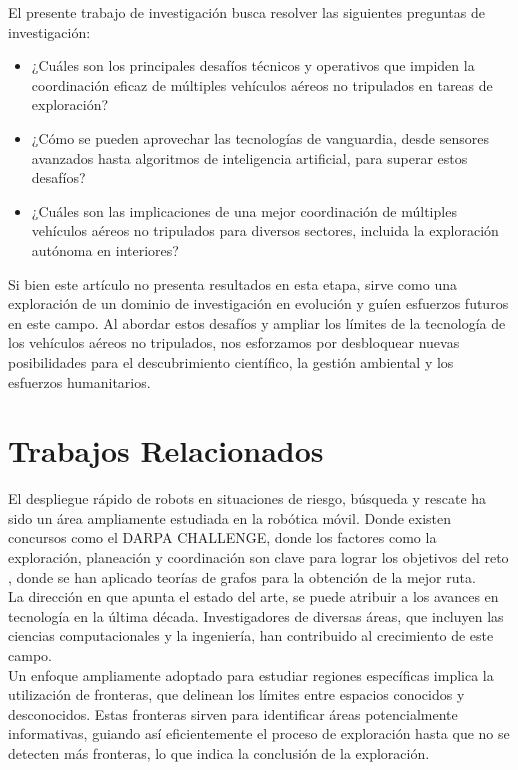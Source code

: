 \documentclass[sigconf]{acmart}
\begin{document}
El presente trabajo de investigación busca resolver las siguientes preguntas de investigación:

\begin{itemize}
  \item ¿Cuáles son los principales desafíos técnicos y operativos que impiden la coordinación eficaz de múltiples vehículos aéreos no tripulados en tareas de exploración?
  \item ¿Cómo se pueden aprovechar las tecnologías de vanguardia, desde sensores avanzados hasta algoritmos de inteligencia artificial, para superar estos desafíos?
  \item ¿Cuáles son las implicaciones de una mejor coordinación de múltiples vehículos aéreos no tripulados para diversos sectores, incluida la exploración autónoma en interiores?
\end{itemize}

Si bien este artículo no presenta resultados en esta etapa, sirve como una exploración de un dominio de investigación en evolución y guíen esfuerzos futuros en este campo. Al abordar estos desafíos y ampliar los límites de la tecnología de los vehículos aéreos no tripulados, nos esforzamos por desbloquear nuevas posibilidades para el descubrimiento científico, la gestión ambiental y los esfuerzos humanitarios.

\section{Trabajos Relacionados}

El despliegue rápido de robots en situaciones de riesgo, búsqueda y rescate ha sido un área ampliamente estudiada en la robótica móvil. Donde existen concursos como el DARPA CHALLENGE, donde los factores como la exploración, planeación y coordinación son clave para lograr los objetivos del reto \cite{DARPA2022}, donde se han aplicado teorías de grafos para la obtención de la mejor ruta.\\

La dirección en que apunta el estado del arte, se puede atribuir a los avances en tecnología en la última década. Investigadores de diversas áreas, que incluyen las ciencias computacionales y la ingeniería, han contribuido al crecimiento de este campo.\\

Un enfoque ampliamente adoptado para estudiar regiones específicas implica la utilización de fronteras, que delinean los límites entre espacios conocidos y desconocidos. Estas fronteras sirven para identificar áreas potencialmente informativas, guiando así eficientemente el proceso de exploración hasta que no se detecten más fronteras, lo que indica la conclusión de la exploración.\\
\end{document}
